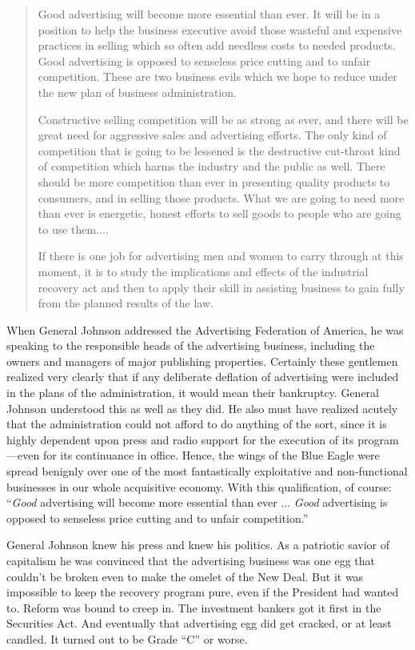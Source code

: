 \documentclass[openany,nobib]{tufte-book}
\begin{document}
\begin{quote}
Good advertising will become more essential than ever. It will be in a
position to help the business executive avoid those wasteful and
expensive practices in selling which so often add needless costs to
needed products. Good advertising is opposed to senseless price cutting
and to unfair competition. These are two business evils which we hope to
reduce under the new plan of business administration.

Constructive selling competition will be as strong as ever, and there
will be great need for aggressive sales and advertising efforts. The
only kind of competition that is going to be lessened is the destructive
cut-throat kind of competition which harms the industry and the public
as well. There should be more competition than ever in presenting
quality products to consumers, and in selling those products. What we
are going to need more than ever is energetic, honest efforts to sell
goods to people who are going to use them....

If there is one job for advertising men and women to carry through at
this moment, it is to study the implications and effects of the
industrial recovery act and then to apply their skill in assisting
business to gain fully from the planned results of the law.
\end{quote}

\pagebreak When General Johnson addressed the Advertising Federation of America, he
was speaking to the responsible heads of the advertising business,
including the owners and managers of major publishing properties.
Certainly these gentlemen realized very clearly that if any deliberate
deflation of advertising were included in the plans of the
administration, it would mean their bankruptcy. General Johnson
understood this as well as they did. He also must have realized acutely
that the administration could not afford to do anything of the sort,
since it is highly dependent upon press and radio support for the
execution of its program---even for its continuance in office. Hence,
the wings of the Blue Eagle were spread benignly over one of the most
fantastically exploitative and non-functional businesses in our whole
acquisitive economy. With this qualification, of course: ``\emph{Good}
advertising will become more essential than ever ... \emph{Good}
advertising is opposed to senseless price cutting and to unfair
competition.''

General Johnson knew his press and knew his politics. As a patriotic
savior of capitalism he was convinced that the advertising business was
one egg that couldn't be broken even to make the omelet of the New Deal.
But it was impossible to keep the recovery program pure, even if the
President had wanted to. Reform was bound to creep in. The investment
bankers got it first in the Securities Act. And eventually that
advertising egg did get cracked, or at least candled. It turned out to
be Grade ``C'' or worse.
\end{document}
